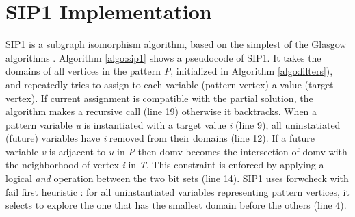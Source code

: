 \documentclass{l4proj}
\begin{document}
\section{SIP1 Implementation}
\label{sec:sip1}
SIP1 is a subgraph isomorphism algorithm, based on the simplest of the Glasgow algorithms \cite{CP2015}. Algorithm \ref{algo:sip1} shows a pseudocode of SIP1. It takes the domains of all vertices in the pattern \emph{P}, initialized in Algorithm \ref{algo:filters}), and repeatedly tries to assign to each variable (pattern vertex) a value (target vertex). If current assignment is compatible with the partial solution, the algorithm makes a recursive call (line 19) otherwise it backtracks. When a pattern variable \emph{u} is instantiated with a target value \emph{i} (line 9), all uninstatiated (future) variables have \emph{i} removed from their domains (line 12). If a future variable \emph{v} is adjacent to \emph{u} in \emph{P} then domv becomes the intersection of domv with the neighborhood of vertex \emph{i} in \emph{T}. This constraint is enforced by applying a logical \emph{and} operation between the two bit sets (line 14). SIP1 uses \gls{forwcheck} with fail first heuristic \cite{haralickElliot:1980}: for all uninstantiated variables representing pattern vertices, it selects to explore the one that has the smallest domain before the others (line 4).
\end{document}
